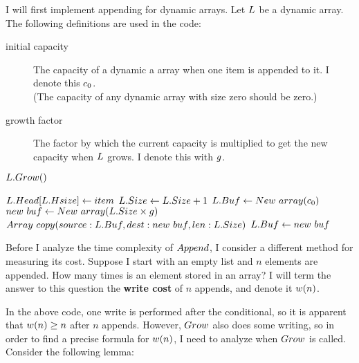 \HdrDynArrayImpl

I will first implement appending for dynamic arrays. Let $L$ be a dynamic array. The following definitions are used in the code:

\begin{description}
	\item[initial capacity] The capacity of a dynamic a array when one item is appended to it. I denote this $c_0$.\\
	(The capacity of any dynamic array with size zero should be zero.)
	\item[growth factor] The factor by which the current capacity is multiplied to get the new capacity when $L$ grows. I denote this with $g$.
\end{description}

\begin{algorithm}
	\begin{algorithmic}[1]
				\State $L.Grow()$
			\EndIf
			
			\State $L.Head[L.Hsize] \gets item$
			\State $L.Size \gets L.Size + 1$
		\EndProcedure
		\Statex
				\State $L.Buf \gets New\ array(c_0)$
			\Else
				\State $new\ buf \gets \FuncNewArray(\VarList.\FieldSize \times \VarGrowthFactor)$
				\State $Array\ copy(source: L.Buf, dest: new\ buf, len: L.Size)$
				\State $L.Buf \gets new\ buf$
			\EndIf
		\EndProcedure
	\end{algorithmic}
\end{algorithm}

\HdrTimeComplex

Before I analyze the time complexity of $Append$, I consider a different method for measuring its cost. Suppose I start with an empty list and $n$ elements are appended. How many times is an element stored in an array? I will term the answer to this question the \textbf{write cost} of $n$ appends, and denote it $w(n)$.

In the above code, one write is performed after the conditional, so it is apparent that $w(n) \geq n$ after $n$ appends. However, $Grow$ also does some writing, so in order to find a precise formula for $w(n)$, I need to analyze when $Grow$ is called. Consider the following lemma:

